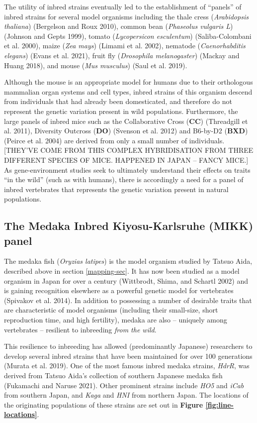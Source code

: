 \documentclass[
]{book}
\begin{document}
The utility of inbred strains eventually led to the establishment of ``panels'' of inbred strains for several model organisms including the thale cress (\emph{Arabidopsis thaliana}) (Bergelson and Roux 2010), common bean (\emph{Phaseolus vulgaris L}) (Johnson and Gepts 1999), tomato (\emph{Lycopersicon esculentum}) (Saliba-Colombani et al. 2000), maize (\emph{Zea mays}) (Limami et al. 2002), nematode (\emph{Caenorhabditis elegans}) (Evans et al. 2021), fruit fly (\emph{Drosophila melanogaster}) (Mackay and Huang 2018), and mouse (\emph{Mus musculus}) (Saul et al. 2019).

Although the mouse is an appropriate model for humans due to their orthologous mammalian organ systems and cell types, inbred strains of this organism descend from individuals that had already been domesticated, and therefore do not represent the genetic variation present in wild populations. Furthermore, the large panels of inbred mice such as the Collaborative Cross (\textbf{CC}) (Threadgill et al. 2011), Diversity Outcross (\textbf{DO}) (Svenson et al. 2012) and B6-by-D2 (\textbf{BXD}) (Peirce et al. 2004) are derived from only a small number of individuals. {[}THEY'VE COME FROM THIS COMPLEX HYBRIDISATION FROM THREE DIFFERENT SPECIES OF MICE. HAPPENED IN JAPAN -- FANCY MICE.{]} As gene-environment studies seek to ultimately understand their effects on traits ``in the wild'' (such as with humans), there is accordingly a need for a panel of inbred vertebrates that represents the genetic variation present in natural populations.

\hypertarget{MIKK-background}{%
\subsection{The Medaka Inbred Kiyosu-Karlsruhe (MIKK) panel}\label{MIKK-background}}

The medaka fish (\emph{Oryzias latipes}) is the model organism studied by Tatsuo Aida, described above in section \ref{mapping-sec}. It has now been studied as a model organism in Japan for over a century (Wittbrodt, Shima, and Schartl 2002) and is gaining recognition elsewhere as a powerful genetic model for vertebrates (Spivakov et al. 2014). In addition to possessing a number of desirable traits that are characteristic of model organisms (including their small-size, short reproduction time, and high fertility), medaka are also -- uniquely among vertebrates -- resilient to inbreeding \emph{from the wild}.

This resilience to inbreeding has allowed (predominantly Japanese) researchers to develop several inbred strains that have been maintained for over 100 generations (Murata et al. 2019). One of the most famous inbred medaka strains, \emph{HdrR}, was derived from Tatsuo Aida's collection of southern Japanese medaka fish (Fukamachi and Naruse 2021). Other prominent strains include \emph{HO5} and \emph{iCab} from southern Japan, and \emph{Kaga} and \emph{HNI} from northern Japan. The locations of the originating populations of these strains are set out in \textbf{Figure \ref{fig:line-locations}}.
\end{document}
